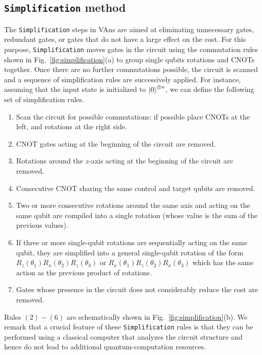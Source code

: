 \subsection{\texttt{Simplification} method}
The \texttt{Simplification} steps in VAns are aimed at eliminating unnecessary gates, redundant gates, or gates that do not have a large effect on the cost. For this purpose, \texttt{Simplification} moves gates in the circuit using the commutation rules shown in Fig.~\ref{fig:simplification}(a) to group single qubits rotations and CNOTs together.
Once there are no further commutations possible, the circuit is scanned and a sequence of simplification rules are successively applied. For instance, assuming that the input state is initialized to $\ket{0}^{\otimes n}$, we can define the following set of simplification rules.
\begin{enumerate}
\item Scan the circuit for possible commutations: if possible place CNOTs at the left, and rotations at the right side.
\item CNOT gates acting at the beginning of the circuit are removed.
\item Rotations around the $z$-axis acting at the beginning of the circuit are removed.
\item Consecutive CNOT sharing the same control and target qubits are removed.
\item Two or more consecutive rotations around the same axis and acting on the same qubit are compiled into a single rotation (whose value is the sum of the previous values).
\item If three or more single-qubit rotations are sequentially acting on the same qubit, they are simplified into a general single-qubit rotation of the form $R_z(\theta_1) R_x(\theta_2) R_z(\theta_3)$ or $R_x(\theta_1) R_z(\theta_2) R_x(\theta_3)$ which has the same action as the previous product of rotations.
\item Gates whose presence in the circuit does not considerably reduce the cost are removed.
\end{enumerate}
Rules $(2)-(6)$ are schematically shown in Fig.~\ref{fig:simplification}(b). We remark that a crucial feature of these \texttt{Simplification} rules is that they can be performed using a classical computer that analyzes the circuit structure and hence do not lead to additional quantum-computation resources.

